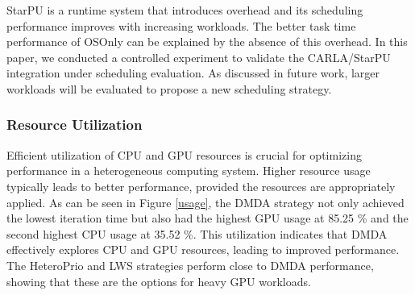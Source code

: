 \documentclass[conference]{IEEEtran}
\begin{document}
StarPU is a runtime system that introduces overhead and its scheduling performance improves with increasing workloads. The better task time performance of OSOnly can be explained by the absence of this overhead. In this paper, we conducted a controlled experiment to validate the CARLA/StarPU integration under scheduling evaluation. As discussed in future work, larger workloads will be evaluated to propose a new scheduling strategy.



\subsubsection{Resource Utilization}

Efficient utilization of CPU and GPU resources is crucial for optimizing performance in a heterogeneous computing system. Higher resource usage typically leads to better performance, provided the resources are appropriately applied. As can be seen in Figure \ref{usage}, the DMDA strategy not only achieved the lowest iteration time but also had the highest GPU usage at 85.25 \% and the second highest CPU usage at 35.52 \%. This utilization indicates that DMDA effectively explores CPU and GPU resources, leading to improved performance. The HeteroPrio and LWS strategies perform close to DMDA performance, showing that these are the options for heavy GPU workloads.

\end{document}
